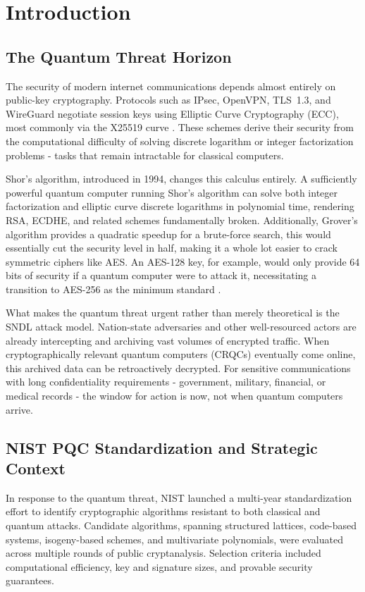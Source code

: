 \documentclass[10pt, conference, letterpaper]{IEEEtran}
\begin{document}
\section{Introduction}

\subsection{The Quantum Threat Horizon}
The security of modern internet communications depends almost entirely on public-key cryptography. Protocols such as IPsec, OpenVPN, TLS~1.3, and WireGuard negotiate session keys using Elliptic Curve Cryptography (ECC), most commonly via the X25519 curve \cite{hulsing2017pqwireguard}. These schemes derive their security from the computational difficulty of solving discrete logarithm or integer factorization problems - tasks that remain intractable for classical computers.

Shor's algorithm, introduced in 1994, changes this calculus entirely. A sufficiently powerful quantum computer running Shor's algorithm can solve both integer factorization and elliptic curve discrete logarithms in polynomial time, rendering RSA, ECDHE, and related schemes fundamentally broken. Additionally, Grover's algorithm provides a quadratic speedup for a brute-force search, this would essentially cut the security level in half, making it a whole lot easier to crack symmetric ciphers like AES. An AES-128 key, for example, would only provide 64 bits of security if a quantum computer were to attack it, necessitating a transition to AES-256 as the minimum standard \cite{shim2025qtrustnet}.

What makes the quantum threat urgent rather than merely theoretical is the SNDL attack model. Nation-state adversaries and other well-resourced actors are already intercepting and archiving vast volumes of encrypted traffic. When cryptographically relevant quantum computers (CRQCs) eventually come online, this archived data can be retroactively decrypted. For sensitive communications with long confidentiality requirements - government, military, financial, or medical records - the window for action is now, not when quantum computers arrive.

\subsection{NIST PQC Standardization and Strategic Context}
In response to the quantum threat, NIST launched a multi-year standardization effort to identify cryptographic algorithms resistant to both classical and quantum attacks. Candidate algorithms, spanning structured lattices, code-based systems, isogeny-based schemes, and multivariate polynomials, were evaluated across multiple rounds of public cryptanalysis. Selection criteria included computational efficiency, key and signature sizes, and provable security guarantees.
\end{document}

